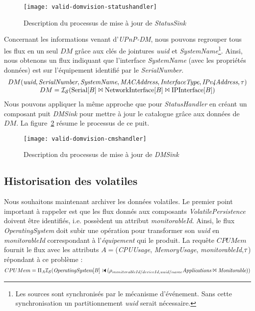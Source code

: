 \begin{figure}[ht]
	\texttt{[image: valid-domvision-statushandler]}
	\caption{Description du processus de mise à jour de \textit{StatusSink}}\label{fig:valid:domvision:statushandler}
\end{figure}

Concernant les informations venant d'\textit{UPnP-DM}, nous pouvons regrouper tous les flux en un seul $DM$ grâce aux clés de jointures \textit{uuid} et \textit{SystemName}\footnote{Les sources sont synchronisés par le mécanisme d'événement. Sans cette synchronisation un partitionnement \textit{uuid} serait nécessaire.}. Ainsi, nous obtenons un flux indiquant que l'interface \textit{SystemName} (avec les propriétés données) est sur l'équipement identifié par le \textit{SerialNumber}. 
$$\begin{array}{c} DM(\textit{uuid},\textit{SerialNumber},\textit{SystemName},\textit{MACAddress},\textit{InterfaceType}, \textit{IPv4Address}, \tau)\\
 DM = \mathcal{I_S}(\textrm{Serial}[B] \Join \textrm{NetworkInterface}[B] \Join \textrm{IPInterface}[B])\end{array}$$
Nous pouvons appliquer la même approche que pour \textit{StatusHandler} en créant un composant puit \textit{DMSink} pour mettre à jour le catalogue grâce aux données de $DM$. La figure~\ref{fig:valid:domvision:cmshandler} résume le processus de ce puit.
\begin{figure}[ht]
        \texttt{[image: valid-domvision-cmshandler]}
	\caption{Description du processus de mise à jour de \textit{DMSink}}\label{fig:valid:domvision:cmshandler}
\end{figure}

\subsection{Historisation des volatiles}\label{sec:valid:domvision:requetes:historisation}
Nous souhaitons maintenant archiver les données volatiles. Le premier point important à rappeler est que les flux donnés aux composants \textit{VolatilePersistence} doivent être identifiés, i.e. possèdent un attribut \textit{monitorableId}. Ainsi, le flux \textit{OperatingSystem} doit subir une opération pour transformer son \textit{uuid} en \textit{monitorableId} correspondant à l'\textit{équipement} qui le produit. La requête $CPUMem$ fournit le flux avec les attributs $A=$(\textit{CPUUsage}, \textit{MemoryUsage}, \textit{monitorableId},$\tau$) répondant à ce problème :
$$CPUMem=\Pi_A \IS(\textit{OperatingSystem}[B]\ssjoin (\rho_{monitorableId/deviceId,uuid/name}\textit{Applications}\Join \textit{Monitorable}))$$

